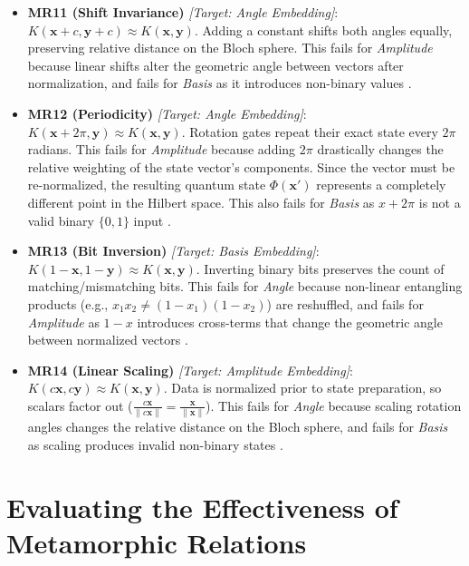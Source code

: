 \documentclass[12pt,a4paper]{article}
\begin{document}
	\begin{itemize}
		\item \textbf{MR11 (Shift Invariance)} \textit{[Target: Angle Embedding]}: $K(\mathbf{x}+c, \mathbf{y}+c) \approx K(\mathbf{x},\mathbf{y})$. Adding a constant shifts both angles equally, preserving relative distance on the Bloch sphere. This fails for \textit{Amplitude} because linear shifts alter the geometric angle between vectors after normalization, and fails for \textit{Basis} as it introduces non-binary values \cite{havlicek2019}.
		
		\item \textbf{MR12 (Periodicity)} \textit{[Target: Angle Embedding]}: $K(\mathbf{x}+2\pi, \mathbf{y}) \approx K(\mathbf{x},\mathbf{y})$. Rotation gates repeat their exact state every $2\pi$ radians. This fails for \textit{Amplitude} because adding $2\pi$ drastically changes the relative weighting of the state vector's components. Since the vector must be re-normalized, the resulting quantum state $\Phi(\mathbf{x}')$ represents a completely different point in the Hilbert space. This also fails for \textit{Basis} as $x+2\pi$ is not a valid binary $\{0, 1\}$ input \cite{Sweke2020, havlicek2019}.
		
		\item \textbf{MR13 (Bit Inversion)} \textit{[Target: Basis Embedding]}: $K(1-\mathbf{x}, 1-\mathbf{y}) \approx K(\mathbf{x},\mathbf{y})$. Inverting binary bits preserves the count of matching/mismatching bits. This fails for \textit{Angle} because non-linear entangling products (e.g., $x_1 x_2 \neq (1-x_1)(1-x_2)$) are reshuffled, and fails for \textit{Amplitude} as $1-x$ introduces cross-terms that change the geometric angle between normalized vectors \cite{Dwarakanath2018}.
		
		\item \textbf{MR14 (Linear Scaling)} \textit{[Target: Amplitude Embedding]}: $K(c\mathbf{x}, c\mathbf{y}) \approx K(\mathbf{x},\mathbf{y})$. Data is normalized prior to state preparation, so scalars factor out ($\frac{c\mathbf{x}}{\|c\mathbf{x}\|} = \frac{\mathbf{x}}{\|\mathbf{x}\|}$). This fails for \textit{Angle} because scaling rotation angles changes the relative distance on the Bloch sphere, and fails for \textit{Basis} as scaling produces invalid non-binary states \cite{mottonen2004}.
	\end{itemize}
	
	\section{Evaluating the Effectiveness of Metamorphic Relations}
	\label{sec:evaluation}
	
\end{document}
